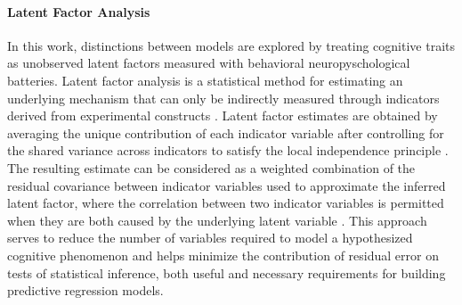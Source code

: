 \documentclass[utf8]{frontiersSCNS} %
\begin{document}
\paragraph*{Latent Factor Analysis} In this work, distinctions between models are explored by treating cognitive traits as unobserved latent factors measured with behavioral neuropyschological batteries. Latent factor analysis is a statistical method for estimating an underlying mechanism that can only be indirectly measured through indicators derived from experimental constructs \citep{finch2015latent}. Latent factor estimates are obtained by averaging the unique contribution of each indicator variable after controlling for the shared variance across indicators to satisfy the local independence principle \citep{sobel1997measurement}. The resulting estimate can be considered as a weighted combination of the residual covariance between indicator variables used to approximate the inferred latent factor, where the correlation between two indicator variables is permitted when they are both caused by the underlying latent variable \citep{cooper2019neuroimaging}. This approach serves to reduce the number of variables required to model a hypothesized cognitive phenomenon and helps minimize the contribution of residual error on tests of statistical inference, both useful and necessary requirements for building predictive regression models.
\end{document}
